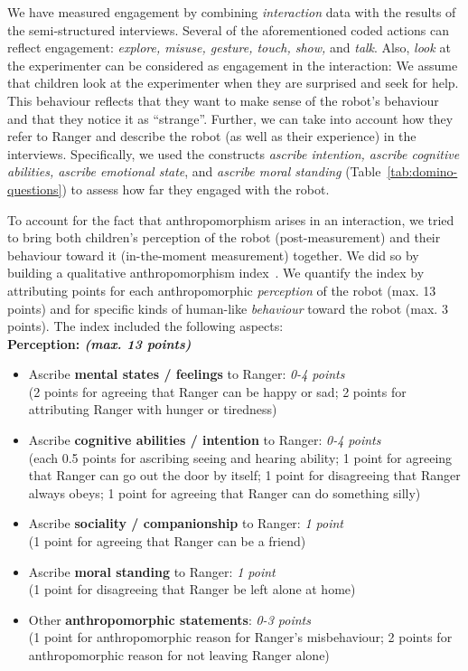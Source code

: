 \documentclass{sig-alternate}
\begin{document}
We have measured engagement by combining \emph{interaction}
data with the results of the semi-structured interviews.  Several of the
aforementioned coded actions can reflect engagement: \textit{explore, misuse,
gesture, touch, show,} and \textit{talk}. Also, \textit{look} at the
experimenter can be considered as engagement in the interaction: We assume that
children look at the experimenter when they are surprised and seek for help.
This behaviour reflects that they want to make sense of the robot's behaviour and
that they notice it as ``strange''. Further, we can take into account how they
refer to Ranger and describe the robot (as well as their experience) in the
interviews.  Specifically, we used the constructs \textit{ascribe intention,
ascribe cognitive abilities, ascribe emotional state}, and \textit{ascribe
moral standing} (Table~\ref{tab:domino-questions}) to assess how far they
engaged with the robot.

To account for the fact that anthropomorphism arises in an interaction, we tried
to bring both children's perception of the robot (post-measurement) and their
behaviour toward it (in-the-moment measurement) together. We did so by building
a qualitative anthropomorphism index~\cite{fink2014dynamics}. We quantify the
index by attributing points for each anthropomorphic \emph{perception} of the
robot (max.  13 points) and for specific kinds of human-like \emph{behaviour}
toward the robot (max.  3 points). The index included the following aspects:\\

\textbf{Perception: \textit{(max. 13 points)}}
\begin{itemize}
	\item Ascribe \textbf{mental states / feelings} to Ranger: \textit{0-4 points}\\
	(2 points for agreeing that Ranger can be happy or sad; 2 points for attributing Ranger with hunger or tiredness)
	\item Ascribe \textbf{cognitive abilities / intention} to Ranger: \textit{0-4 points}\\ 
	(each 0.5 points for ascribing seeing and hearing ability; 1 point for agreeing that Ranger can go out the door by itself; 1 point for disagreeing that Ranger always obeys; 1 point for agreeing that Ranger can do something silly)
	\item Ascribe \textbf{sociality / companionship} to Ranger: \textit{1 point}\\ 
	(1 point for agreeing that Ranger can be a friend)
	\item Ascribe \textbf{moral standing} to Ranger: \textit{1 point}\\ (1 point for disagreeing that Ranger be left alone at home)
	\item Other \textbf{anthropomorphic statements}: \textit{0-3 points}\\ 
	(1 point for anthropomorphic reason for Ranger's misbehaviour; 2 points for anthropomorphic reason for not leaving Ranger alone) 
\end{itemize}
\end{document}
